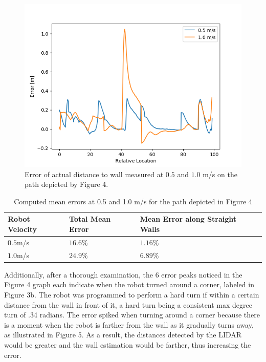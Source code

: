\documentclass{article}
\begin{document}
\begin{figure}[h]
\begin{center}
\includegraphics[width=.75\textwidth]{imgs/Error_graph.png} %
\caption{Error of actual distance to wall measured at $0.5$ and $1.0$ m/s on the path depicted by Figure 4.}
\end{center}
\end{figure}

\begin{table}[h]
\centering
\begin{tabularx}{0.8\textwidth} {
  | >{\centering\arraybackslash}X
  | >{\centering\arraybackslash}X
  | >{\centering\arraybackslash}X | }
 \hline
 Robot Velocity & Total Mean Error & Mean Error along Straight Walls\\
 \hline
 $0.5$m/s  & $16.6\%$  & $1.16\%$ \\
 \hline
 $1.0$m/s & $24.9\%$  & $6.89\%$  \\
\hline
\end{tabularx}
\caption{Computed mean errors at 0.5 and 1.0 m/s for the path depicted in Figure 4}
\label{tab:abc}
\end{table}

Additionally, after a thorough examination, the 6 error peaks noticed in the Figure 4 graph each indicate when the robot turned around a corner, labeled in Figure 3b. The robot was programmed to perform a hard turn if within a certain distance from the wall in front of it, a hard turn being a consistent max degree turn of .34 radians. The error spiked when turning around a corner because there is a moment when the robot is farther from the wall as it gradually turns away, as illustrated in Figure 5. As a result, the distances detected by the LIDAR would be greater and the wall estimation would be farther, thus increasing the error. \\
\end{document}
